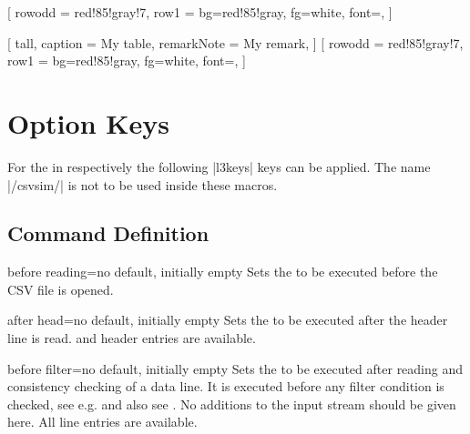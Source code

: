 \documentclass[a4paper,11pt]{ltxdoc}
\begin{document}
\begin{docCommands}[
    doc parameter = \oarg{options}\marg{file name}\oarg{taboptions 1}\oarg{taboptions 2},
    doc new = 2023-10-13
  ]
\begin{dispExample}
  [
    row{odd}   = {red!85!gray!7},
    row{1}     = {bg=red!85!gray, fg=white, font=\bfseries},
  ]
\end{dispExample}


\begin{dispExample}
  [
    tall,
    caption      = {My table},
    remark{Note} = {My remark},
  ]
  [
    row{odd}   = {red!85!gray!7},
    row{1}     = {bg=red!85!gray, fg=white, font=\bfseries},
  ]
\end{dispExample}


\end{docCommands}


\clearpage
\section{Option Keys}\label{sec:schluessel}%
For the  in  respectively 
the following |l3keys| keys can be applied. The  name |/csvsim/| is not
to be used inside these macros.


\subsection{Command Definition}%

\begin{docCsvKey}{before reading}{=}{no default, initially empty}
  Sets the  to be executed before the CSV file is opened.
\end{docCsvKey}

\begin{docCsvKey}{after head}{=}{no default, initially empty}
  Sets the  to be executed after the header line is read.
   and header entries are available.
\end{docCsvKey}

\begin{docCsvKey}{before filter}{=}{no default, initially empty}
  Sets the  to be executed after reading and consistency checking
  of a data line. It is executed before any filter condition is checked,
  see e.g.  and
  also see .
  No additions to the input stream should be given here.
  All line entries are available.
\end{docCsvKey}
\end{document}
